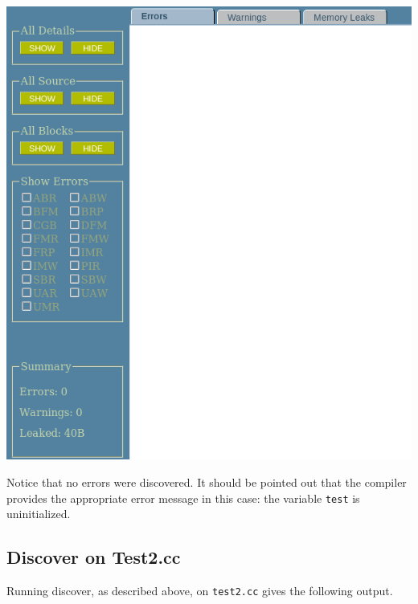 \documentclass[12pt]{article}
\begin{document}
\begin{center}
\includegraphics[width=6 in]{images/test1.png}
\end{center}

Notice that no errors were discovered.  It should be pointed out that
the compiler provides the appropriate error message in this case: the variable \verb+test+ is uninitialized.

\subsection{Discover on Test2.cc}
Running discover, as described above, on \verb+test2.cc+ 
gives the following output.
\end{document}

